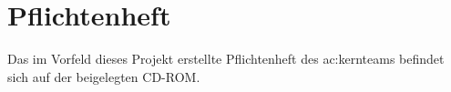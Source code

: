 %
%
\chapter{Pflichtenheft}\label{ch:pflichtenheft}
    Das im Vorfeld dieses Projekt erstellte Pflichtenheft des \acrfull{ac:kernteam}s befindet sich auf der beigelegten CD-ROM.
